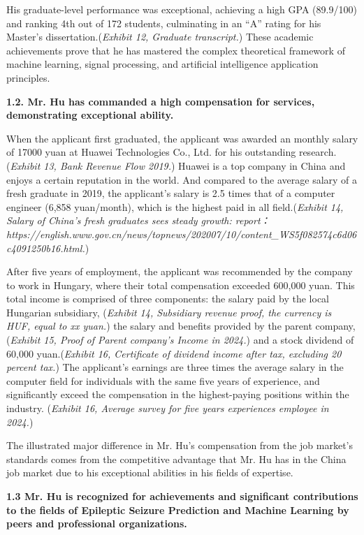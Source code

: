 \documentclass{article}
\begin{document}
His graduate-level performance was exceptional, achieving a high GPA (89.9/100) and ranking 4th out of 172 students, culminating in an “A” rating for his Master’s dissertation.({\it Exhibit 12, Graduate transcript.}) These academic achievements prove that he has mastered the complex theoretical framework of machine learning, signal processing, and artificial intelligence application principles.

{\bf 1.2. Mr. Hu has commanded a high compensation for services, demonstrating exceptional ability. }

When the applicant first graduated, the applicant was awarded an monthly salary of 17000 yuan at Huawei Technologies Co., Ltd. for his outstanding research.({\it Exhibit 13, Bank Revenue Flow 2019.}) Huawei is a top company in China and enjoys a certain reputation in the world. And compared to the average salary of a fresh graduate in 2019, the applicant's salary is 2.5 times that of a computer engineer (6,858 yuan/month), which is the highest paid in all field.({\it Exhibit 14, Salary of China's fresh graduates sees steady growth: report： https://english.www.gov.cn/news/topnews/202007/10/content_WS5f082574c6d06c4091250b16.html.})

After five years of employment, the applicant was recommended by the company to work in Hungary, where their total compensation exceeded 600,000 yuan. This total income is comprised of three components: the salary paid by the local Hungarian subsidiary, ({\it Exhibit 14, Subsidiary revenue proof, the currency is HUF, equal to xx yuan.}) the salary and benefits provided by the parent company,({\it Exhibit 15, Proof of Parent company's Income in 2024.}) and a stock dividend of 60,000 yuan.({\it Exhibit 16, Certificate of dividend income after tax, excluding 20 percent tax.}) The applicant's earnings are three times the average salary in the computer field for individuals with the same five years of experience, and significantly exceed the compensation in the highest-paying positions within the industry. ({\it Exhibit 16, Average survey for five years experiences employee in 2024.})

The illustrated major difference in Mr. Hu's compensation from the job market's standards comes from the competitive advantage that Mr. Hu has in the China job market due to his exceptional abilities in his fields of expertise. 

{\bf 1.3 Mr. Hu is recognized for achievements and significant contributions to the fields of Epileptic Seizure Prediction and Machine Learning by peers and professional organizations. }
\end{document}
